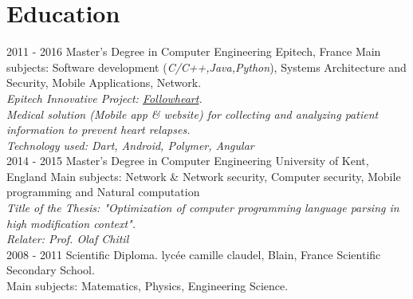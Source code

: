 \documentclass[]{friggeri-cv}
\begin{document}
\section{Education}
\begin{entrylist}
  \entry
    {2011 - 2016}
    {Master's Degree in Computer Engineering}
    {Epitech, France}
    {Main subjects: Software development (\textit{C/C++,Java,Python}), Systems Architecture and Security, Mobile Applications, Network.\\
    \emph{Epitech Innovative Project: \href{http://followheart.fr}{Followheart}.}\\
    \emph{Medical solution (Mobile app \& website) for collecting and analyzing patient information to prevent heart relapses.}\\
    \emph{Technology used: Dart, Android, Polymer, Angular}\\}
  \entry
    {2014 - 2015}
    {Master's Degree in Computer Engineering}
    {University of Kent, England}
    {Main subjects: Network \& Network security, Computer security, Mobile programming and Natural computation\\
    \emph{Title of the Thesis: "Optimization of computer programming language parsing in high modification context".}\\
    \emph{Relater: Prof. Olaf Chitil}\\}
  \entry
    {2008 - 2011}
    {Scientific Diploma.}
    {lycée camille claudel, Blain, France}
    {Scientific Secondary School.\\
    Main subjects: Matematics, Physics, Engineering Science.}
\end{entrylist}
\end{document}
